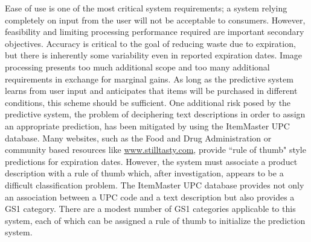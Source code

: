 \documentclass[11pt]{article} %
\begin{document}
Ease of use is one of the most critical system requirements; a system relying completely on input from the user will not be acceptable to consumers. However, feasibility and limiting processing performance required are important secondary objectives. Accuracy is critical to the goal of reducing waste due to expiration, but there is inherently some variability even in reported expiration dates. Image processing presents too much additional scope and too many additional requirements in exchange for marginal gains. As long as the predictive system learns from user input and anticipates that items will be purchased in different conditions, this scheme should be sufficient. One additional risk posed by the predictive system, the problem of deciphering text descriptions in order to assign an appropriate prediction, has been mitigated by using the ItemMaster UPC database. Many websites, such as the Food and Drug Administration or community based resources like \url{www.stilltasty.com}, provide ``rule of thumb" style predictions for expiration dates. However, the system must associate a product description with a rule of thumb which, after investigation, appears to be a difficult classification problem. The ItemMaster UPC database provides not only an association between a UPC code and a text description but also provides a GS1 category. There are a modest number of GS1 categories applicable to this system, each of which can be assigned a rule of thumb to initialize the prediction system.
\newline \quad \newline
\end{document}
